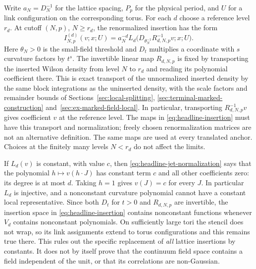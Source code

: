 Write $a_N=D_N^{-1}$ for the lattice spacing, $P_p$ for the physical
period, and $U$ for a link configuration on the corresponding torus.
For each $d$ choose a reference level $r_d$. At cutoff $(N,p)$, $N\ge r_d$,
the renormalized insertion has the form
\begin{equation}\label{eq:headline-insertion}
 I^{(d)}_{N,p}(v;x;U)=a_N^{-d}
 L_d\bigl(D_{\theta_N^{-1}}R_{d,N,p}^{-1}v;x;U\bigr).
\end{equation}
Here $\theta_N>0$ is the small-field threshold and $D_t$ multiplies a
coordinate with $s$ curvature factors by $t^s$. The invertible linear map
$R_{d,N,p}$ is fixed by transporting the inserted Wilson density from
level $N$ to $r_d$ and reading its polynomial coefficient there. This is
exact transport of the unnormalized inserted density by the same block
integrations as the uninserted density, with the scale factors and remainder
bounds of Sections~\ref{sec:local-splitting},
\ref{sec:terminal-marked-construction} and~\ref{sec:ex-marked-field-local}.
In particular, transporting $R_{d,N,p}^{-1}v$ gives coefficient $v$ at the
reference level. The maps in \eqref{eq:headline-insertion} must have this
transport and normalization; freely chosen renormalization matrices are
not an alternative definition. The same maps are used at every translated
anchor. Choices at the finitely many levels $N<r_d$ do not affect the limits.

\begin{remark}
\label{rem:headline-nonconstant-sections}
If $L_d(v)$ is constant, with value $c$, then
\eqref{eq:headline-jet-normalization} says that the polynomial
$h\mapsto v(h\cdot J)$ has constant term $c$ and all other coefficients
zero: its degree is at most $d$. Taking $h=1$ gives $v(J)=c$ for every
$J$. In particular $L_d$ is injective, and a nonconstant curvature
polynomial cannot have a constant local representative. Since both $D_t$
for $t>0$ and $R_{d,N,p}$ are invertible, the insertion space in
\eqref{eq:headline-insertion} contains nonconstant functions whenever
$V_d$ contains nonconstant polynomials. On sufficiently large tori the
stencil does not wrap, so its link assignments extend to torus
configurations and this remains true there. This rules out the specific
replacement of \emph{all} lattice insertions by constants. It does not
by itself prove that the continuum field space contains a field independent
of the unit, or that its correlations are non-Gaussian.
\end{remark}


